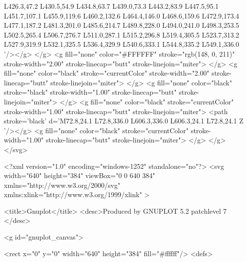 		L426.3,47.2 L430.5,54.9 L434.8,63.7 L439.0,73.3 L443.2,83.9 L447.5,95.1 L451.7,107.1 L455.9,119.6
		L460.2,132.6 L464.4,146.0 L468.6,159.6 L472.9,173.4 L477.1,187.2 L481.3,201.0 L485.6,214.7 L489.8,228.0
		L494.0,241.0 L498.3,253.5 L502.5,265.4 L506.7,276.7 L511.0,287.1 L515.2,296.8 L519.4,305.5 L523.7,313.2
		L527.9,319.9 L532.1,325.5 L536.4,329.9 L540.6,333.1 L544.8,335.2 L549.1,336.0  '/></g>
	</g>
<g fill="none" color="#FFFFFF" stroke="rgb(148,   0, 211)" stroke-width="2.00" stroke-linecap="butt" stroke-linejoin="miter">
</g>
<g fill="none" color="black" stroke="currentColor" stroke-width="2.00" stroke-linecap="butt" stroke-linejoin="miter">
</g>
<g fill="none" color="black" stroke="black" stroke-width="1.00" stroke-linecap="butt" stroke-linejoin="miter">
</g>
<g fill="none" color="black" stroke="currentColor" stroke-width="1.00" stroke-linecap="butt" stroke-linejoin="miter">
	<path stroke='black'  d='M72.8,24.1 L72.8,336.0 L606.3,336.0 L606.3,24.1 L72.8,24.1 Z  '/></g>
<g fill="none" color="black" stroke="currentColor" stroke-width="1.00" stroke-linecap="butt" stroke-linejoin="miter">
</g>
</g>
</svg>

<?xml version="1.0" encoding="windows-1252"  standalone="no"?>
<svg 
 width="640" height="384"
 viewBox="0 0 640 384"
 xmlns="http://www.w3.org/2000/svg"
 xmlns:xlink="http://www.w3.org/1999/xlink"
>

<title>Gnuplot</title>
<desc>Produced by GNUPLOT 5.2 patchlevel 7 </desc>

<g id="gnuplot_canvas">

<rect x="0" y="0" width="640" height="384" fill="#ffffff"/>
<defs>

